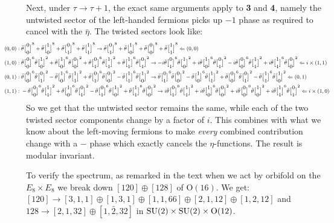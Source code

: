 \documentclass[11pt, class=article, crop=false]{standalone}
\begin{document}
\begin{enumerate}
	Next, under $\tau \to \tau+1$, the exact same arguments apply to \textbf{3} and \textbf{4}, namely the untwisted sector of the left-handed fermions picks up $-1$ phase as required to cancel with the $\bar \eta$. The twisted sectors look like:
	\[
		\footnotesize
		\hspace{-.5in}
		\begin{aligned}
			(0,0):\;&  \bar \theta\twist00^8 + \bar \theta\twist10^8 + \bar \theta\twist01^8 + \bar \theta\twist11^8 \to \bar \theta\twist01^8 + \bar \theta\twist10^8 + \bar \theta\twist00^8 +\bar \theta\twist11^8 \Leftarrow (0,0)
			\\
			(1,0):\;& \bar \theta\twist00^6 \bar \theta \twist10^2 + \bar \theta\twist10^6 \bar \theta \twist 00^2 + \bar\theta \twist01^6  \bar \theta \twist11^2 + \bar \theta \twist11^6 \bar \theta\twist01^2 \to -i \bar \theta\twist01^6 \bar \theta \twist10^2 + i \bar \theta\twist10^6 \bar \theta \twist 01^2 - i \bar\theta \twist00^6  \bar \theta \twist11^2 + i \bar \theta \twist11^6 \bar \theta\twist00^2  \Leftarrow i \times (1,1)
			\\
			(0,1):\;&  \bar \theta\twist00^6 \bar \theta \twist01^2 
			- \bar \theta\twist10^6 \bar \theta \twist 11^2
			+ \bar\theta \twist01^6  \bar \theta \twist00^2 
			- \bar \theta \twist11^6 \bar \theta\twist10^2 
			\to  \bar \theta\twist01^6 \bar \theta \twist00^2 
			- \bar \theta\twist10^6 \bar \theta \twist 11^2 
			+ \bar\theta \twist00^6  \bar \theta \twist01^2 
			- \bar \theta \twist11^6 \bar \theta\twist10^2  \Leftarrow  (0,1)
			\\
			(1,1):\;&  - \bar \theta\twist00^6 \bar \theta \twist11^2 + \bar \theta\twist10^6 \bar \theta \twist 01^2
			- \bar\theta \twist01^6  \bar \theta \twist10^2 
			+ \bar \theta \twist11^6 \bar \theta\twist00^2
			\to i \bar \theta\twist01^6 \bar \theta \twist11^2 
			+i \bar \theta\twist10^6 \bar \theta \twist 00^2 
			+ i \bar\theta \twist00^6  \bar \theta \twist10^2 
			+ i \bar \theta \twist11^6 \bar \theta\twist01^2  \Leftarrow i \times (1,0)
		\end{aligned}
	\]
	So we get that the untwisted sector remains the same, while each of the two twisted sector components change by a factor of $i$. This combines with what we know about the left-moving fermions to make \emph{every} combined contribution change with a $-$ phase which exactly cancels the $\eta$-functions. The result is modular invariant.
	
	To verify the spectrum, as remarked in the text when we act by orbifold on the $E_8 \times E_8$ we break down $[120]\oplus [128]$ of $\mathrm O(16)$. We get: $[120] \to [3,1,1] \oplus [1,3,1] \oplus [1,1,66] \oplus [2,1,12] \oplus [1,2,12]$ and $128 \to [2,1,32] \oplus [1,\bar 2, 32]$ in $\mathrm{SU}(2) \times \mathrm{SU}(2) \times \mathrm O(12)$.
	

\end{enumerate}
\end{document}
